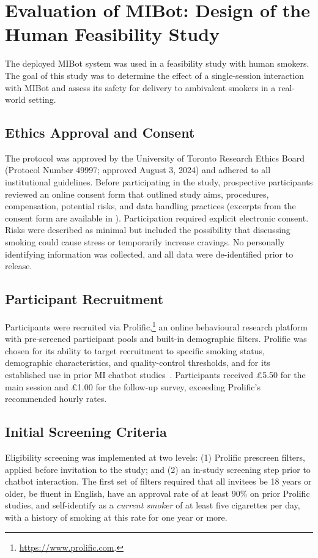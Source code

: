 \chapter{Evaluation of MIBot: Design of the Human Feasibility Study}
\label{ch:mibot-feasibility-study}
The deployed MIBot system was used in a feasibility study with human smokers. The goal of this study was to determine the effect of a single-session interaction with MIBot and assess its safety for delivery to ambivalent smokers in a real-world setting.

\section{Ethics Approval and Consent}
The protocol was approved by the University of Toronto Research Ethics Board (Protocol Number 49997; approved August 3, 2024) \citep{rose2025ethics} and adhered to all institutional guidelines. Before participating in the study, prospective participants reviewed an online consent form that outlined study aims, procedures, compensation, potential risks, and data handling practices (excerpts from the consent form are available in ). Participation required explicit electronic consent. Risks were described as minimal but included the possibility that discussing smoking could cause stress or temporarily increase cravings. No personally identifying information was collected, and all data were de-identified prior to release.

\section{Participant Recruitment}
\label{sec:recruitment}
Participants were recruited via Prolific,\footnote{\url{https://www.prolific.com}.} an online behavioural research platform with pre-screened participant pools and built-in demographic filters. Prolific was chosen for its ability to target recruitment to specific smoking status, demographic characteristics, and quality-control thresholds, and for its established use in prior MI chatbot studies~\citep{brown2023mi,info:doi/10.2196/20251}. Participants received \pounds5.50 for the main session and \pounds1.00 for the follow-up survey, exceeding Prolific's recommended hourly rates.


\section{Initial Screening Criteria}
Eligibility screening was implemented at two levels: (1) Prolific prescreen filters, applied before invitation to the study; and (2) an in-study screening step prior to chatbot interaction. The first set of filters required that all invitees be 18 years or older, be fluent in English, have an approval rate of at least 90\% on prior Prolific studies, and self-identify as a \emph{current smoker} of at least five cigarettes per day, with a history of smoking at this rate for one year or more.


